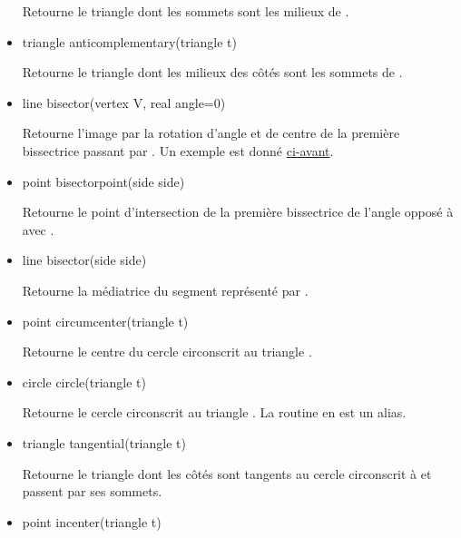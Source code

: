 \documentclass[pdftex]{article}
\begin{document}
\begin{itemize}
  Retourne le triangle dont les sommets sont les milieux de .
\item {}
  \begin{Vcolor}
    triangle anticomplementary(triangle t)
  \end{Vcolor}
  Retourne le triangle dont les milieux des côtés sont les sommets de .
\item {}
  \begin{Vcolor}
    line bisector(vertex V, real angle=0)
  \end{Vcolor}
  Retourne l'image par la rotation d'angle  et de
  centre  de la première bissectrice passant
  par . Un exemple est donné \href{#bisectorvertex}{ci-avant}.
\item {}
  \begin{Vcolor}
    point bisectorpoint(side side)
  \end{Vcolor}
  Retourne le point d'intersection de la première bissectrice de
  l'angle opposé à  avec .
\item {}
  \begin{Vcolor}
    line bisector(side side)
  \end{Vcolor}
  Retourne la médiatrice du segment représenté par .
\item {}
  \begin{Vcolor}
    point circumcenter(triangle t)
  \end{Vcolor}
  Retourne le centre du cercle circonscrit au triangle .
\item {}
  \begin{Vcolor}
    circle circle(triangle t)
  \end{Vcolor}
  Retourne le cercle circonscrit au triangle . La routine
   en est un alias.
\item {}
  \begin{Vcolor}
    triangle tangential(triangle t)
  \end{Vcolor}
  Retourne le triangle dont les côtés sont tangents au cercle
  circonscrit à  et passent par ses sommets.
\item {}
  \begin{Vcolor}
    point incenter(triangle t)

\end{Vcolor}
\end{itemize}
\end{document}
